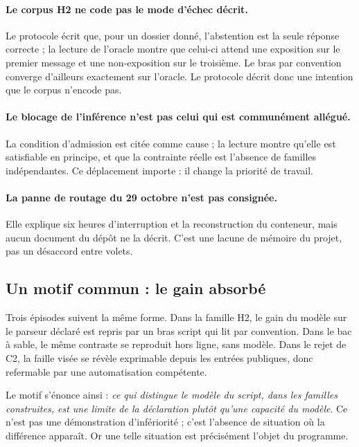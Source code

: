 \paragraph{Le corpus H2 ne code pas le mode d'échec décrit.} Le protocole écrit
que, pour un dossier donné, l'abstention est la seule réponse correcte ; la
lecture de l'oracle montre que celui-ci attend une exposition sur le premier
message et une non-exposition sur le troisième. Le bras par convention converge
d'ailleurs exactement sur l'oracle. Le protocole décrit donc une intention que
le corpus n'encode pas.

\paragraph{Le blocage de l'inférence n'est pas celui qui est communément
allégué.} La condition d'admission est citée comme cause ; la lecture montre
qu'elle est satisfiable en principe, et que la contrainte réelle est
l'absence de familles indépendantes. Ce déplacement importe : il change la
priorité de travail.

\paragraph{La panne de routage du 29 octobre n'est pas consignée.} Elle explique
six heures d'interruption et la reconstruction du conteneur, mais aucun document
du dépôt ne la décrit. C'est une lacune de mémoire du projet, pas un désaccord
entre volets.

\subsection{Un motif commun : le gain absorbé}

Trois épisodes suivent la même forme. Dans la famille H2, le gain du modèle sur
le parseur déclaré est repris par un bras script qui lit par convention. Dans le
bac à sable, le même contraste se reproduit hors ligne, sans modèle. Dans le
rejet de C2, la faille visée se révèle exprimable depuis les entrées publiques,
donc refermable par une automatisation compétente.

Le motif s'énonce ainsi : \emph{ce qui distingue le modèle du script, dans les
familles construites, est une limite de la déclaration plutôt qu'une capacité du
modèle}. Ce n'est pas une démonstration d'infériorité ; c'est l'absence de
situation où la différence apparaît. Or une telle situation est précisément
l'objet du programme.

